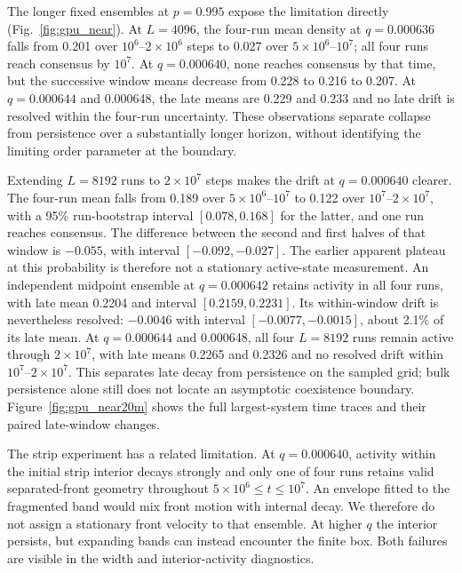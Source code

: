 \documentclass[pre,twocolumn,superscriptaddress,showpacs,floatfix]{revtex4-2}
\begin{document}
The longer fixed ensembles at $p=0.995$ expose the limitation directly
(Fig.~\ref{fig:gpu_near}). At $L=4096$, the four-run mean density at
$q=0.000636$ falls from 0.201 over $10^6$--$2\times10^6$ steps to
0.027 over $5\times10^6$--$10^7$; all four runs reach consensus by
$10^7$. At $q=0.000640$, none reaches consensus by that time, but the
successive window means decrease from 0.228 to 0.216 to 0.207. At
$q=0.000644$ and 0.000648, the late means are 0.229 and 0.233 and no
late drift is resolved within the four-run uncertainty. These observations
separate collapse from persistence over a substantially longer horizon,
without identifying the limiting order parameter at the boundary.

Extending $L=8192$ runs to $2\times10^7$ steps makes the drift at
$q=0.000640$ clearer. The four-run mean falls from 0.189 over
$5\times10^6$--$10^7$ to 0.122 over $10^7$--$2\times10^7$,
with a 95\% run-bootstrap interval $[0.078,0.168]$ for the latter, and
one run reaches consensus. The difference between the second and first
halves of that window is $-0.055$, with interval $[-0.092,-0.027]$.
The earlier apparent plateau at this probability is therefore not a
stationary active-state measurement.
An independent midpoint ensemble at $q=0.000642$ retains activity in all
four runs, with late mean 0.2204 and interval $[0.2159,0.2231]$.
Its within-window drift is nevertheless resolved: $-0.0046$ with
interval $[-0.0077,-0.0015]$, about 2.1\% of its late mean.
At $q=0.000644$ and 0.000648, all four $L=8192$ runs remain active
through $2\times10^7$, with late means 0.2265 and 0.2326 and no resolved
drift within $10^7$--$2\times10^7$. This separates late decay from
persistence on the sampled grid; bulk persistence alone still does not
locate an asymptotic coexistence boundary.
Figure~\ref{fig:gpu_near20m} shows the full largest-system time traces
and their paired late-window changes.

The strip experiment has a related limitation. At $q=0.000640$, activity
within the initial strip interior decays strongly and only one of four
runs retains valid separated-front geometry throughout
$5\times10^6\le t\le10^7$. An envelope fitted to the fragmented band
would mix front motion with internal decay. We therefore do not assign
a stationary front velocity to that ensemble. At higher $q$ the interior
persists, but expanding bands can instead encounter the finite box.
Both failures are visible in the width and interior-activity diagnostics.
\end{document}
